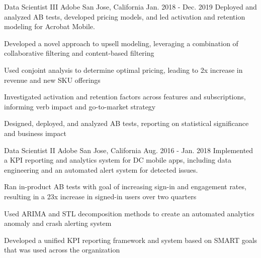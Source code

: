 \begin{cventries}
\cventry
    {Data Scientist III} %
    {Adobe} %
    {San Jose, California} %
    {Jan. 2018 - Dec. 2019} %
    {Deployed and analyzed AB tests, developed pricing models, and led activation and retention modeling for Acrobat Mobile.} %
    {
      \begin{cvitems} %
        \item {Developed a novel approach to upsell modeling, leveraging a combination of collaborative filtering and content-based filtering}
        \item {Used conjoint analysis to determine optimal pricing, leading to 2x increase in revenue and new SKU offerings}
        \item {Investigated activation and retention factors across features and subscriptions, informing verb impact and go-to-market strategy}
        \item {Designed, deployed, and analyzed AB tests, reporting on statistical significance and business impact}
      \end{cvitems}
    }

\cventry
    {Data Scientist II} %
    {Adobe} %
    {San Jose, California} %
    {Aug. 2016 - Jan. 2018} %
    {Implemented a KPI reporting and analytics system for DC mobile apps, including data engineering and an automated alert system for detected issues.} %
    {
      \begin{cvitems} %
        \item {Ran in-product AB tests with goal of increasing sign-in and engagement rates, resulting in a 23x increase in signed-in users over two quarters}
        \item {Used ARIMA and STL decomposition methods to create an automated analytics anomaly and crash alerting system}
        \item {Developed a unified KPI reporting framework and system based on SMART goals that was used across the organization}
      \end{cvitems}
    }

\end{cventries}

